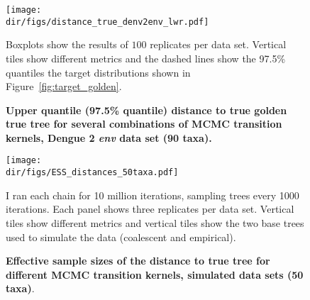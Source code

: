 \begin{figure}[!ht]
\begin{center}
\texttt{[image: \\dir/figs/distance\_true\_denv2env\_lwr.pdf]} 
\end{center}
 \caption[Upper quantile (97.5\% quantile) distance to true golden true tree for several combinations of MCMC transition kernels, Dengue 2 \textit{env} data set (90 taxa).]{\textbf{Upper quantile (97.5\% quantile) distance to true golden true tree for several combinations of MCMC transition kernels, Dengue 2 \textit{env} data set (90 taxa).}
  }
  Boxplots show the results of $100$ replicates per data set.
  Vertical tiles show different metrics and the dashed lines show the 97.5\% quantiles the target distributions shown in Figure~\ref{fig:target_golden}.
 \label{sfig:distance_true_denv2_upr}
\end{figure}

\begin{figure}[!ht]
\begin{center}
\texttt{[image: \\dir/figs/ESS\_distances\_50taxa.pdf]} 
\end{center}
 \caption[Effective sample sizes of the distance to true tree for different MCMC transition kernels, simulated data sets (50 taxa).]{\textbf{Effective sample sizes of the distance to true tree for different MCMC transition kernels, simulated data sets (50 taxa)}.
  }
  I ran each chain for 10 million iterations, sampling trees every 1000 iterations.
  Each panel shows three replicates per data set.  
  Vertical tiles show different metrics and vertical tiles show the two base trees used to simulate the data (coalescent and empirical).
 \label{sfig:ess_true_50taxa}
\end{figure}